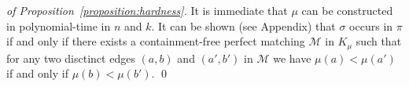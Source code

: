 \documentclass[a4paper]{llncs}
\begin{document}
\begin{proof}[of Proposition~\ref{proposition:hardness}]
  It is immediate that $\mu$ can be constructed in polynomial-time in $n$ and $k$.
  It can be shown (see Appendix) that
  $\sigma$ occurs in $\pi$ if and only if
  there exists a containment-free perfect matching
  $\mathcal{M}$ in $K_\mu$ such that
  for any two disctinct edges
  $(a, b)$ and $(a', b')$ in $\mathcal{M}$
  we have $\mu(a) < \mu(a')$ if and only if $\mu(b) < \mu(b')$.
  \qed
\end{proof}

\end{document}
